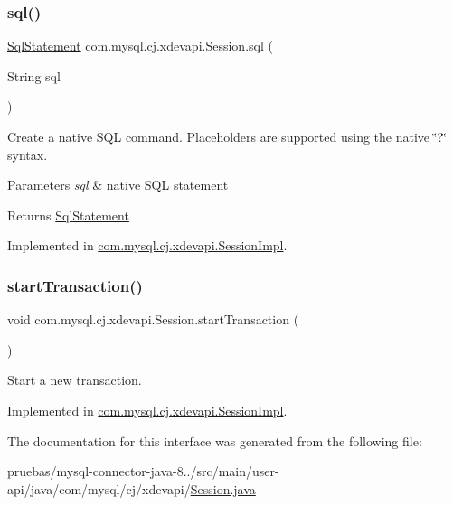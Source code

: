 \subsubsection{\texorpdfstring{sql()}{sql()}}
{\footnotesize\ttfamily \mbox{\hyperlink{interfacecom_1_1mysql_1_1cj_1_1xdevapi_1_1_sql_statement}{Sql\+Statement}} com.\+mysql.\+cj.\+xdevapi.\+Session.\+sql (\begin{DoxyParamCaption}\item[{String}]{sql }\end{DoxyParamCaption})}

Create a native S\+QL command. Placeholders are supported using the native \char`\"{}?\char`\"{} syntax.


\begin{DoxyParams}{Parameters}
{\em sql} & native S\+QL statement \\
\hline
\end{DoxyParams}
\begin{DoxyReturn}{Returns}
\mbox{\hyperlink{interfacecom_1_1mysql_1_1cj_1_1xdevapi_1_1_sql_statement}{Sql\+Statement}} 
\end{DoxyReturn}


Implemented in \mbox{\hyperlink{classcom_1_1mysql_1_1cj_1_1xdevapi_1_1_session_impl_a28b412626c5f92aa146ede32d4e8033d}{com.\+mysql.\+cj.\+xdevapi.\+Session\+Impl}}.

\mbox{\label{interfacecom_1_1mysql_1_1cj_1_1xdevapi_1_1_session_a1c0d0951a9c3f1d92f9bd22f337dd86c}} 
\subsubsection{\texorpdfstring{start\+Transaction()}{startTransaction()}}
{\footnotesize\ttfamily void com.\+mysql.\+cj.\+xdevapi.\+Session.\+start\+Transaction (\begin{DoxyParamCaption}{ }\end{DoxyParamCaption})}

Start a new transaction. 

Implemented in \mbox{\hyperlink{classcom_1_1mysql_1_1cj_1_1xdevapi_1_1_session_impl_a765f8d81a34ca32d608bdeb5e56e3119}{com.\+mysql.\+cj.\+xdevapi.\+Session\+Impl}}.



The documentation for this interface was generated from the following file\+:\begin{DoxyCompactItemize}
\item 
pruebas/mysql-\/connector-\/java-\/8../src/main/user-\/api/java/com/mysql/cj/xdevapi/\mbox{\hyperlink{user-api_2java_2com_2mysql_2cj_2xdevapi_2_session_8java}{Session.\+java}}\end{DoxyCompactItemize}
